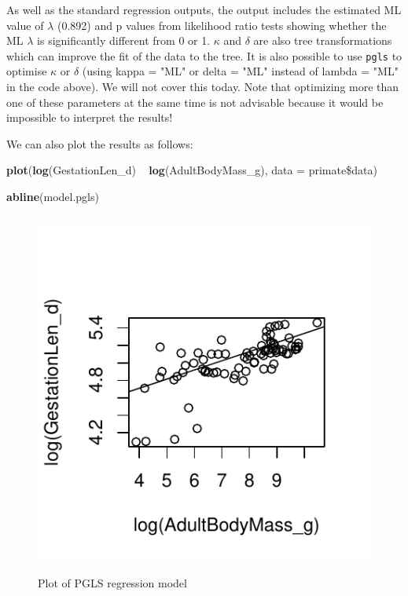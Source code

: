 \documentclass[12pt]{article}
\newcommand{\KeywordTok}[1]{\textcolor[rgb]{0.13,0.29,0.53}{\textbf{{#1}}}}
\newcommand{\DataTypeTok}[1]{\textcolor[rgb]{0.13,0.29,0.53}{{#1}}}
\newcommand{\StringTok}[1]{\textcolor[rgb]{0.31,0.60,0.02}{{#1}}}
\newcommand{\NormalTok}[1]{{#1}}
\begin{document}
As well as the standard regression outputs, the output includes the estimated ML value of $\lambda$ (0.892) and p values from likelihood ratio tests showing whether the ML $\lambda$ is significantly different from 0 or 1. $\kappa$ and $\delta$ are also tree transformations which can improve the fit of the data to the tree. It is also possible to use \texttt{pgls} to optimise $\kappa$ or $\delta$  (using kappa = "ML" or delta = "ML" instead of lambda = "ML" in the code above). We will not cover this today. Note that optimizing more than one of these parameters at the same time is not advisable because it would be impossible to interpret the results!

We can also plot the results as follows:

\begin{snugshade}
\begin{Highlighting}[]
\KeywordTok{plot}\NormalTok{(}\KeywordTok{log}\NormalTok{(GestationLen_d) ~}\StringTok{ }\KeywordTok{log}\NormalTok{(AdultBodyMass_g), }\DataTypeTok{data =} \NormalTok{primate\$data)}

\KeywordTok{abline}\NormalTok{(model.pgls)}
\end{Highlighting}
\end{snugshade}

\begin{figure}[H]
\centering
\includegraphics[width = 12cm, height = 12cm, keepaspectratio=true]{PGLSplot.pdf}
\caption{Plot of PGLS regression model}
\label{figure}
\end{figure}
\end{document}
